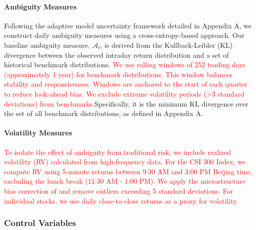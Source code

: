 \documentclass[preprint,12pt,authoryear]{elsarticle}
\begin{document}
\paragraph{Ambiguity Measures}
Following the adaptive model uncertainty framework detailed in Appendix A, we construct daily ambiguity measures using a cross-entropy-based approach. Our baseline ambiguity measure, $\mathcal{A}_t$, is derived from the Kullback-Leibler (KL) divergence between the observed intraday return distribution and a set of historical benchmark distributions. \textcolor{red}{We use rolling windows of 252 trading days (approximately 1 year) for benchmark distributions. This window balances stability and responsiveness. Windows are anchored to the start of each quarter to reduce look-ahead bias. We exclude extreme volatility periods (>3 standard deviations) from benchmarks.}Specifically, it is the minimum KL divergence over the set of all benchmark distributions, as defined in Appendix A.

\paragraph{Volatility Measures}
\textcolor{red}{To isolate the effect of ambiguity from traditional risk, we include realized volatility (RV) calculated from high-frequency data. For the CSI 300 Index, we compute RV using 5-minute returns between 9:30 AM and 3:00 PM Beijing time, excluding the lunch break (11:30 AM - 1:00 PM). We apply the microstructure bias correction of \citet{Hansen2012} and remove outliers exceeding 5 standard deviations. For individual stocks, we use daily close-to-close returns as a proxy for volatility.}

\subsubsection{Control Variables}
\end{document}
